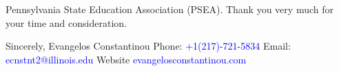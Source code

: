 \documentclass[12pt]{letter}
\begin{document}
\begin{letter}{Pennsylvania State Education Association (PSEA).}
Thank you very much for your time and consideration.


\noindent Sincerely,
\newline\noindent Evangelos Constantinou
\vspace{4mm}
\newline\noindent Phone: \textcolor{blue}{+1(217)-721-5834}
\newline\noindent Email: \textcolor{blue}{ecnstnt2@illinois.edu}
\newline\noindent Website \textcolor{blue}{evangelosconstantinou.com}
\end{letter}
\end{document}
